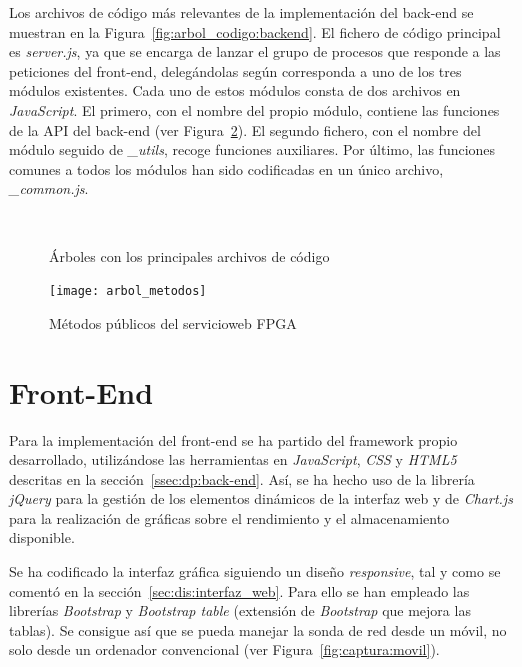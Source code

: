 Los archivos de código más relevantes de la implementación del \gls{back-end} se muestran en la Figura~\ref{fig:arbol_codigo:backend}.
El fichero de código principal es \textit{server.js}, ya que se encarga de lanzar el grupo de procesos que responde a las peticiones del \gls{front-end}, delegándolas según corresponda a uno de los tres módulos existentes.
Cada uno de estos módulos consta de dos archivos en \textit{JavaScript}.
El primero, con el nombre del propio módulo, contiene las funciones de la \gls{API} del \gls{back-end} (ver Figura~\ref{fig:arbol_metodos}).
El segundo fichero, con el nombre del módulo seguido de \textit{\_utils}, recoge funciones auxiliares.
Por último, las funciones comunes a todos los módulos han sido codificadas en un único archivo, \textit{\_common.js}.

\begin{figure}[!htp]
  \begin{center}
    \qquad
    \hspace{1.5cm}
    \\
    \caption{Árboles con los principales archivos de código}
    \label{fig:arbol_codigo}
  \end{center}
\end{figure}

\begin{figure}[!htp]
  \centering
  \texttt{[image: arbol\_metodos]}
  \caption{Métodos públicos del \gls{servicioweb} \gls{FPGA}}
  \label{fig:arbol_metodos}
\end{figure}

\section{Front-End\label{sec:imp:front_end}}

Para la implementación del \gls{front-end} se ha partido del \gls{framework} propio desarrollado, utilizándose las herramientas en \textit{JavaScript}, \textit{CSS} y \textit{HTML5} descritas en la sección~\ref{ssec:dp:back-end}.
Así, se ha hecho uso de la librería \textit{jQuery} para la gestión de los elementos dinámicos de la interfaz web y de \textit{Chart.js} para la realización de gráficas sobre el rendimiento y el almacenamiento disponible.

Se ha codificado la interfaz gráfica siguiendo un diseño \textit{responsive}, tal y como se comentó en la sección~\ref{sec:dis:interfaz_web}.
Para ello se han empleado las librerías \textit{Bootstrap} y \textit{Bootstrap table} (extensión de \textit{Bootstrap} que mejora las tablas).
Se consigue así que se pueda manejar la sonda de red desde un móvil, no solo desde un ordenador convencional (ver Figura~\ref{fig:captura:movil}).

